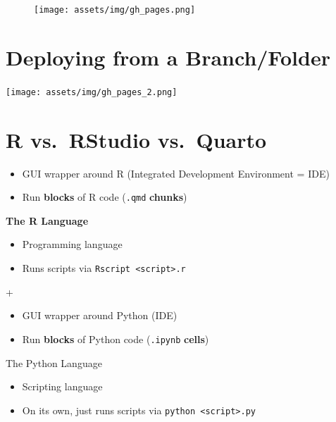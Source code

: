\documentclass[
  letterpaper,
  DIV=11,
  numbers=noendperiod,
  oneside]{scrreprt}
\providecommand{\tightlist}{%
  \setlength{\itemsep}{0pt}\setlength{\parskip}{0pt}}\usepackage{longtable,booktabs,array}
\begin{document}
\begin{figure}

{\centering \texttt{[image: assets/img/gh\_pages.png]}

}

\end{figure}

\hypertarget{deploying-from-a-branchfolder-1}{%
\section{Deploying from a
Branch/Folder}\label{deploying-from-a-branchfolder-1}}

\texttt{[image: assets/img/gh\_pages\_2.png]}

\hypertarget{r-vs.-rstudio-vs.-quarto-1}{%
\section{R vs.~RStudio vs.~Quarto}\label{r-vs.-rstudio-vs.-quarto-1}}

\begin{itemize}
\tightlist
\item
  GUI wrapper around R (Integrated Development Environment = IDE)
\item
  Run \textbf{blocks} of R code (\texttt{.qmd} \textbf{chunks})
\end{itemize}

\textbf{The R Language }

\begin{itemize}
\tightlist
\item
  Programming language
\item
  Runs scripts via \texttt{Rscript\ \textless{}script\textgreater{}.r}
\end{itemize}

+

\begin{itemize}
\tightlist
\item
  GUI wrapper around Python (IDE)
\item
  Run \textbf{blocks} of Python code (\texttt{.ipynb} \textbf{cells})
\end{itemize}

The Python Language

\begin{itemize}
\tightlist
\item
  Scripting language
\item
  On its own, just runs scripts via
  \texttt{python\ \textless{}script\textgreater{}.py}
\end{itemize}
\end{document}
